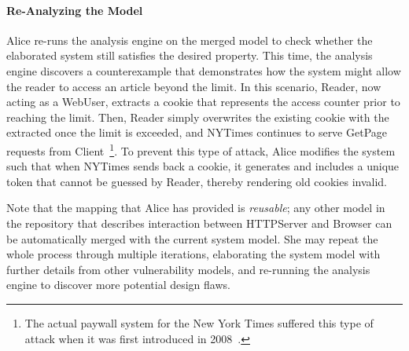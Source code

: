 \paragraph{\textbf{Re-Analyzing the Model}}

Alice re-runs the analysis engine on the merged model to check
whether the elaborated system still satisfies the desired
property. This time, the analysis engine discovers a counterexample
that demonstrates how the system might allow the reader to access an
article beyond the limit. In this scenario, \textsf{Reader}, now
acting as a \textsf{WebUser}, extracts a
cookie that represents the access counter prior to reaching the
limit. Then, \textsf{Reader} simply overwrites the existing cookie
with the extracted once the limit is exceeded, and \textsf{NYTimes}
continues to serve \textsf{GetPage} requests from
\textsf{Client}~\footnote{The actual paywall system for the New York
  Times suffered this type of attack when it was first introduced in
  2008~\cite{nytimes-attack}.}. To prevent this type of attack, Alice
modifies the system such that when \textsf{NYTimes} sends back a
cookie, it generates and includes a unique token that cannot be
guessed by \textsf{Reader}, thereby rendering old cookies invalid.


Note that the mapping that Alice has provided is \textit{reusable};
any other model in the repository that describes interaction between
\textsf{HTTPServer} and \textsf{Browser} can be automatically merged
with the current system model. She may repeat the whole process
through multiple iterations, elaborating the system model with further
details from other vulnerability models, and re-running the analysis
engine to discover more potential design flaws.

